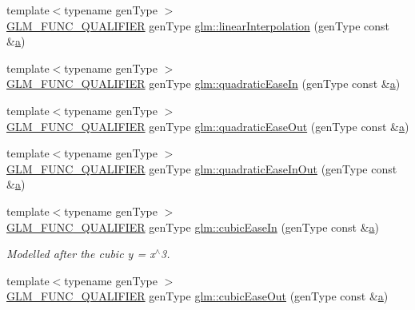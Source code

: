 \begin{DoxyCompactItemize}
\item 
{\footnotesize template$<$typename gen\+Type $>$ }\\\hyperlink{setup_8hpp_a33fdea6f91c5f834105f7415e2a64407}{G\+L\+M\+\_\+\+F\+U\+N\+C\+\_\+\+Q\+U\+A\+L\+I\+F\+I\+ER} gen\+Type \hyperlink{group__gtx__easing_ga290c3e47cb0a49f2e8abe90b1872b649}{glm\+::linear\+Interpolation} (gen\+Type const \&\hyperlink{_s_d_l__opengl__glext_8h_a3309789fc188587d666cda5ece79cf82}{a})
\item 
{\footnotesize template$<$typename gen\+Type $>$ }\\\hyperlink{setup_8hpp_a33fdea6f91c5f834105f7415e2a64407}{G\+L\+M\+\_\+\+F\+U\+N\+C\+\_\+\+Q\+U\+A\+L\+I\+F\+I\+ER} gen\+Type \hyperlink{group__gtx__easing_gaf42089d35855695132d217cd902304a0}{glm\+::quadratic\+Ease\+In} (gen\+Type const \&\hyperlink{_s_d_l__opengl__glext_8h_a3309789fc188587d666cda5ece79cf82}{a})
\item 
{\footnotesize template$<$typename gen\+Type $>$ }\\\hyperlink{setup_8hpp_a33fdea6f91c5f834105f7415e2a64407}{G\+L\+M\+\_\+\+F\+U\+N\+C\+\_\+\+Q\+U\+A\+L\+I\+F\+I\+ER} gen\+Type \hyperlink{group__gtx__easing_ga283717bc2d937547ad34ec0472234ee3}{glm\+::quadratic\+Ease\+Out} (gen\+Type const \&\hyperlink{_s_d_l__opengl__glext_8h_a3309789fc188587d666cda5ece79cf82}{a})
\item 
{\footnotesize template$<$typename gen\+Type $>$ }\\\hyperlink{setup_8hpp_a33fdea6f91c5f834105f7415e2a64407}{G\+L\+M\+\_\+\+F\+U\+N\+C\+\_\+\+Q\+U\+A\+L\+I\+F\+I\+ER} gen\+Type \hyperlink{group__gtx__easing_ga03e8fc2d7945a4e63ee33b2159c14cea}{glm\+::quadratic\+Ease\+In\+Out} (gen\+Type const \&\hyperlink{_s_d_l__opengl__glext_8h_a3309789fc188587d666cda5ece79cf82}{a})
\item 
{\footnotesize template$<$typename gen\+Type $>$ }\\\hyperlink{setup_8hpp_a33fdea6f91c5f834105f7415e2a64407}{G\+L\+M\+\_\+\+F\+U\+N\+C\+\_\+\+Q\+U\+A\+L\+I\+F\+I\+ER} gen\+Type \hyperlink{group__gtx__easing_gaff52f746102b94864d105563ba8895ae}{glm\+::cubic\+Ease\+In} (gen\+Type const \&\hyperlink{_s_d_l__opengl__glext_8h_a3309789fc188587d666cda5ece79cf82}{a})
\begin{DoxyCompactList}\small\item\em Modelled after the cubic y = x$^\wedge$3. \end{DoxyCompactList}\item 
{\footnotesize template$<$typename gen\+Type $>$ }\\\hyperlink{setup_8hpp_a33fdea6f91c5f834105f7415e2a64407}{G\+L\+M\+\_\+\+F\+U\+N\+C\+\_\+\+Q\+U\+A\+L\+I\+F\+I\+ER} gen\+Type \hyperlink{group__gtx__easing_ga40d746385d8bcc5973f5bc6a2340ca91}{glm\+::cubic\+Ease\+Out} (gen\+Type const \&\hyperlink{_s_d_l__opengl__glext_8h_a3309789fc188587d666cda5ece79cf82}{a})

\end{DoxyCompactItemize}
